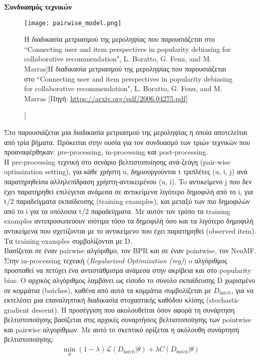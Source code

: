 \noindent \textbf{Συνδυασμός τεχνικών}\\
\begin{figure}[H]
	\centering
	\texttt{[image: pairwise\_model.png]}
	\caption[H διαδικασία μετριασμού της μεροληψίας που παρουσιάζεται στο ``Connecting user and item perspectives in popularity
	debiasing for collaborative recommendation", L. Boratto, G. Fenu, and M. Marras]{H διαδικασία μετριασμού της μεροληψίας που παρουσιάζεται στο ``Connecting user and item perspectives in popularity
		debiasing for collaborative recommendation", L. Boratto, G. Fenu, and M. Marras [Πηγή: \url{https://arxiv.org/pdf/2006.04275.pdf}]}
	\label{fig:pairwise}
\end{figure}
\noindent Στο \cite{borattoConnectingUserItem2021} παρουσιάζεται μια διαδικασία μετριασμού της μεροληψίας η οποία αποτελείται από τρία βήματα. Πρόκειται στην ουσία για τον συνδυασμό των τριών τεχνικών που προαναφέρθηκαν: pre-processing, in-processing και post-processing.\\
Η pre-processing τεχνική στο σενάριο βελτιστοποίησης ανά-ζεύγη (pair-wise optimization setting), για κάθε χρήστη u, δημιουργούνται t τριπλέτες (u, i, j) ανά παρατηρηθείσα αλληλεπίδραση χρήστη-αντικειμένου 
(u, i). To αντικείμενο j που δεν έχει παρατηρηθεί επιλέγεται ανάμεσα σε αντικείμενα λιγότερο δημοφιλή από το i, για t/2 παραδείγματα εκπαίδευσης (training examples), και μεταξύ των πιο δημοφιλών από το i για τα υπόλοιπα t/2 παραδείγματα. Με αυτόν τον τρόπο τα training examples αντιπροσωπεύουν ισότιμα τόσο τα δημοφιλή όσο και τα λιγότερο δημοφιλή αντικείμενα που σχετίζονται με το αντικείμενο που έχει παρατηρηθεί (observed item). Τα training examples συμβολίζονται με D.\\
Βασίζεται σε έναν pairwise αλγόριθμο, τον BPR και σε έναν pointwise, τον NeuMF. Στην in-processing τεχνική (\textit{Regularized Optimization (reg)}) o αλγόριθμος προσπαθεί να πετύχει ένα αντιστάθμισμα ανάμεσα στην ακρίβεια και στο popularity bias. Ο αρχικός αλγόριθμος λαμβάνει ως είσοδο το σύνολο εκπαίδευσης D χωρισμένο σε κομμάτια (batches), καθένα από αυτά τα κομμάτια συμβολίζεται με $ D_{batch} $, για να εκτελέσει μια επαναληπτική διαδικασία στοχαστικής καθόδου κλίσης (stochastic gradient descent). Η προσέγγιση που ακολουθείται όσον αφορά τη συνάρτηση βελτιστοποίησης βασίζεται στις αρχικές συναρτήσεις βελτιστοποίησης των pointwise και pairwise αλγορίθμων. Με αυτό το σκεπτικό ορίζεται η ακόλουθη συνάρτηση βελτιστοποίησης:
\begin{align}
	\min_\theta\left( 1-\lambda \right) \mathcal{L}\left( D_{batch} |\theta \right) + \lambda C\left( D_{batch} |\theta \right)
	\end{align}
